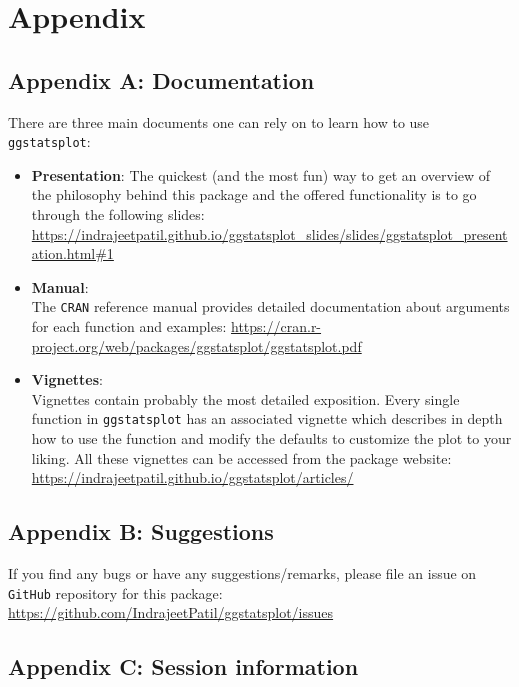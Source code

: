 \documentclass[
]{article}
\begin{document}
\newpage

\hypertarget{appendix}{%
\section{Appendix}\label{appendix}}

\hypertarget{appendix-a-documentation}{%
\subsection{Appendix A: Documentation}\label{appendix-a-documentation}}

There are three main documents one can rely on to learn how to use
\texttt{ggstatsplot}:

\begin{itemize}
\item
  \textbf{Presentation}:
  The quickest (and the most fun) way to get an overview of
  the philosophy behind this package and the offered functionality is to go
  through the following slides:
  \url{https://indrajeetpatil.github.io/ggstatsplot_slides/slides/ggstatsplot_presentation.html\#1}
\item
  \textbf{Manual}:\\
  The \texttt{CRAN} reference manual provides detailed documentation about arguments
  for each function and examples:
  \url{https://cran.r-project.org/web/packages/ggstatsplot/ggstatsplot.pdf}
\item
  \textbf{Vignettes}:\\
  Vignettes contain probably the most detailed exposition. Every single
  function in \texttt{ggstatsplot} has an associated vignette which describes in
  depth how to use the function and modify the defaults to customize the plot
  to your liking. All these vignettes can be accessed from the package
  website: \url{https://indrajeetpatil.github.io/ggstatsplot/articles/}
\end{itemize}

\hypertarget{appendix-b-suggestions}{%
\subsection{Appendix B: Suggestions}\label{appendix-b-suggestions}}

If you find any bugs or have any suggestions/remarks, please file an issue on
\texttt{GitHub} repository for this package:
\url{https://github.com/IndrajeetPatil/ggstatsplot/issues}

\hypertarget{appendix-c-session-information}{%
\subsection{Appendix C: Session information}\label{appendix-c-session-information}}
\end{document}
